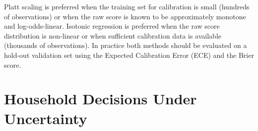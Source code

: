 \begin{context}
\begin{remark}
Platt scaling is preferred when the training set for calibration is small (hundreds of observations) or when the raw score is known to be approximately monotone and log-odds-linear. Isotonic regression is preferred when the raw score distribution is non-linear or when sufficient calibration data is available (thousands of observations). In practice both methods should be evaluated on a hold-out validation set using the Expected Calibration Error (ECE) and the Brier score.
\end{remark}

\end{context}

\section{Household Decisions Under Uncertainty}
\label{sec:household-decisions}

